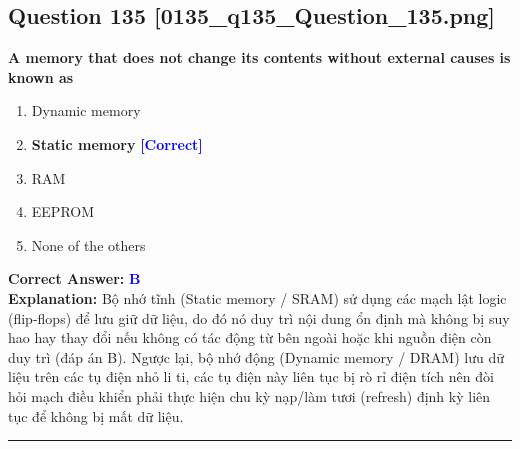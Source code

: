\documentclass[11pt,a4paper]{article}
\begin{document}
\begin{minipage}{\textwidth}
\subsection*{Question 135 \quad \footnotesize{[0135\_q135\_Question\_135.png]}}
\noindent \textbf{A memory that does not change its contents without external causes is known as}

\begin{enumerate}[label=\Alph*.]
    \item Dynamic memory
    \item \textbf{Static memory} \hfill \textcolor{blue}{\textbf{[Correct]}}
    \item RAM
    \item EEPROM
    \item None of the others
\end{enumerate}

\noindent \textbf{Correct Answer:} \textcolor{blue}{\textbf{B}} \\[2pt]
\noindent \textbf{Explanation:} Bộ nhớ tĩnh (Static memory / SRAM) sử dụng các mạch lật logic (flip-flops) để lưu giữ dữ liệu, do đó nó duy trì nội dung ổn định mà không bị suy hao hay thay đổi nếu không có tác động từ bên ngoài hoặc khi nguồn điện còn duy trì (đáp án B). Ngược lại, bộ nhớ động (Dynamic memory / DRAM) lưu dữ liệu trên các tụ điện nhỏ li ti, các tụ điện này liên tục bị rò rỉ điện tích nên đòi hỏi mạch điều khiển phải thực hiện chu kỳ nạp/làm tươi (refresh) định kỳ liên tục để không bị mất dữ liệu.

\par\vspace{0.3cm}
\hrule
\vspace{0.3cm}
\end{minipage}
\end{document}
